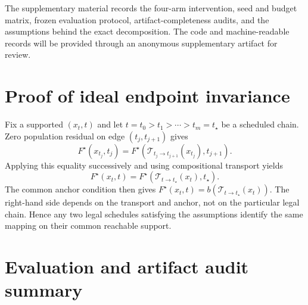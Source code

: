 \documentclass{article}
\newif\ifshowcomments
\newcommand{\todo}[1]{%
  \ifshowcomments{\color{todored}\textbf{[TODO: #1]}}\fi}
\begin{document}
The supplementary material records the four-arm intervention, seed and budget
matrix, frozen evaluation protocol, artifact-completeness audits, and the
assumptions behind the exact decomposition. The code and machine-readable
records will be provided through an anonymous supplementary artifact for
review.

\todo{Create and verify the anonymous artifact URL; do not link an
identity-revealing repository in the double-blind submission.}




\appendix

\section{Proof of ideal endpoint invariance}
\label{app:ideal-proof}

Fix a supported $(x_t,t)$ and let
$t=t_0>t_1>\cdots>t_m=t_\star$ be a scheduled chain. Zero population residual
on edge $(t_j,t_{j+1})$ gives
\begin{equation}
  F^\star(x_{t_j},t_j)
  =F^\star(\mathcal{T}_{t_j\rightarrow t_{j+1}}(x_{t_j}),t_{j+1}).
\end{equation}
Applying this equality successively and using compositional transport yields
\begin{equation}
  F^\star(x_t,t)
  =F^\star(\mathcal{T}_{t\rightarrow t_\star}(x_t),t_\star).
\end{equation}
The common anchor condition then gives
$F^\star(x_t,t)=b(\mathcal{T}_{t\rightarrow t_\star}(x_t))$.
The right-hand side depends on the transport and anchor, not on the particular
legal chain. Hence any two legal schedules satisfying the assumptions identify
the same mapping on their common reachable support.

\section{Evaluation and artifact audit summary}
\label{app:evaluation-audit}
\end{document}
